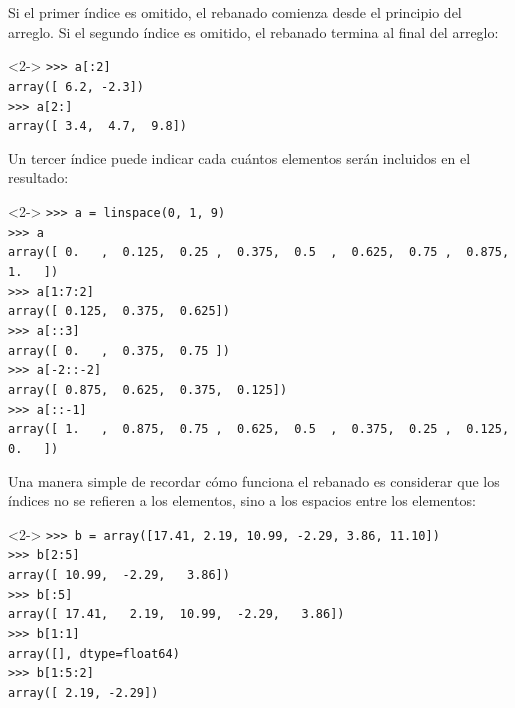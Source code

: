 \begin{frame}[fragile]
Si el primer índice es omitido, el rebanado comienza desde el principio del arreglo. Si el segundo índice es omitido, el rebanado termina al final del arreglo:
\begin{exampleblock}{}<2->
\verb|>>> a[:2]| \\
\pause
\verb|array([ 6.2, -2.3])| \\
\pause
\verb|>>> a[2:]| \\
\pause
\verb|array([ 3.4,  4.7,  9.8])|
\end{exampleblock}
\end{frame}
\begin{frame}[fragile]
Un tercer índice puede indicar cada cuántos elementos serán incluidos en el resultado:
\fontsize{12}{12}\selectfont
\begin{exampleblock}{}<2->
\verb|>>> a = linspace(0, 1, 9)| \\
\pause
\verb|>>> a| \\
\pause
\verb|array([ 0.   ,  0.125,  0.25 ,  0.375,  0.5  ,  0.625,  0.75 ,  0.875,  1.   ])| \\
\pause
\verb|>>> a[1:7:2]| \\
\pause
\verb|array([ 0.125,  0.375,  0.625])| \\
\pause
\verb|>>> a[::3]| \\
\pause
\verb|array([ 0.   ,  0.375,  0.75 ])| \\
\pause
\verb|>>> a[-2::-2]| \\
\pause
\verb|array([ 0.875,  0.625,  0.375,  0.125])| \\
\pause
\verb|>>> a[::-1]| \\
\pause
\verb|array([ 1.   ,  0.875,  0.75 ,  0.625,  0.5  ,  0.375,  0.25 ,  0.125,  0.   ])|
\end{exampleblock}
\end{frame}
\begin{frame}[fragile]
Una manera simple de recordar cómo funciona el rebanado es considerar que los índices no se refieren a los elementos, sino a los espacios entre los elementos:
\fontsize{12}{12}\selectfont
\begin{exampleblock}{}<2->
\verb|>>> b = array([17.41, 2.19, 10.99, -2.29, 3.86, 11.10])| \\
\pause
\verb|>>> b[2:5]| \\
\pause
\verb|array([ 10.99,  -2.29,   3.86])| \\
\pause
\verb|>>> b[:5]| \\
\pause
\verb|array([ 17.41,   2.19,  10.99,  -2.29,   3.86])| \\
\pause
\verb|>>> b[1:1]| \\
\pause
\verb|array([], dtype=float64)| \\
\pause
\verb|>>> b[1:5:2]| \\
\pause
\verb|array([ 2.19, -2.29])|
\end{exampleblock}
\end{frame}
